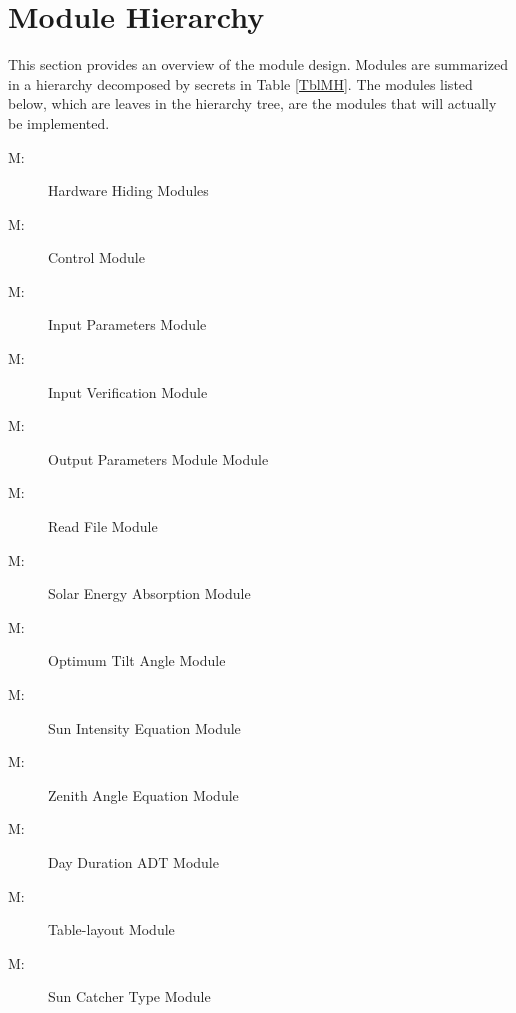 \documentclass[12pt, titlepage]{article}
\newcounter{mnum}
\newcommand{\mthemnum}{M\themnum}
\begin{document}
\section{Module Hierarchy} \label{SecMH}

This section provides an overview of the module design. Modules are summarized
in a hierarchy decomposed by secrets in Table \ref{TblMH}. The modules listed
below, which are leaves in the hierarchy tree, are the modules that will
actually be implemented.

\begin{description}
\item [ \mthemnum \label{mHH}:] Hardware Hiding Modules
\item [ \mthemnum \label{mIC}:] Control Module
\item [ \mthemnum \label{mIP}:] Input Parameters Module
\item [ \mthemnum \label{mIV}:] Input Verification Module
\item [ \mthemnum \label{mOP}:] Output Parameters Module
Module\item [ \mthemnum \label{mR}:] Read File Module
\item [ \mthemnum \label{mSE}:] Solar Energy Absorption Module
\item [ \mthemnum \label{mOTA}:] Optimum Tilt Angle Module
\item [ \mthemnum \label{mSIE}:] Sun Intensity Equation
Module
\item [ \mthemnum \label{mZAE}:] Zenith Angle Equation
Module
\item [ \mthemnum \label{mDD}:] Day Duration ADT Module
\item [ \mthemnum \label{mT}:] Table-layout Module
\item [ \mthemnum \label{mSCT}:] Sun Catcher Type Module
\end{description}
\end{document}
